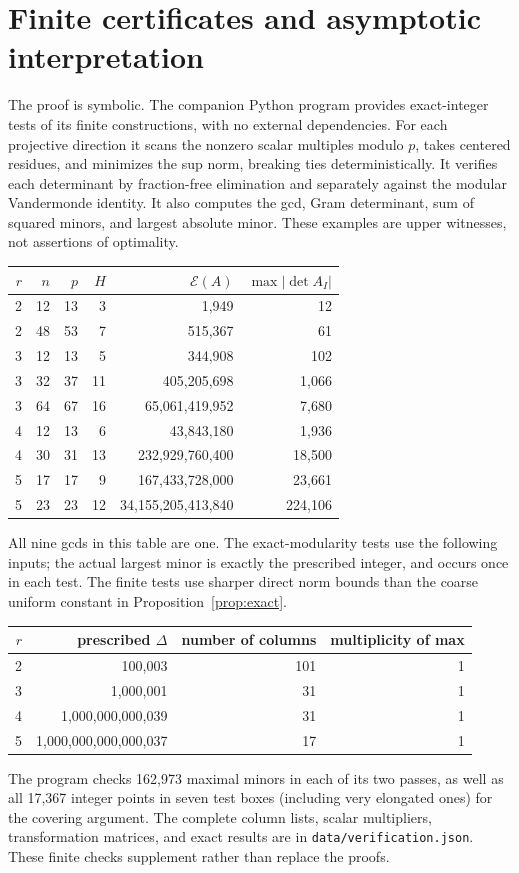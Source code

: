 \documentclass[11pt]{article}
\theoremstyle{remark}\newtheorem{remark}[theorem]{Remark}
\begin{document}
\section{Finite certificates and asymptotic interpretation}
The proof is symbolic. The companion Python program provides exact-integer tests of its finite constructions, with no external dependencies. For each projective direction it scans the nonzero scalar multiples modulo $p$, takes centered residues, and minimizes the sup norm, breaking ties deterministically. It verifies each determinant by fraction-free elimination and separately against the modular Vandermonde identity. It also computes the gcd, Gram determinant, sum of squared minors, and largest absolute minor. These examples are upper witnesses, not assertions of optimality.

\begin{center}
\begin{tabular}{rrrrrr}
\toprule
$r$&$n$&$p$&$H$&$\mathcal E(A)$&$\max |\det A_I|$\\
\midrule
2&12&13&3&1,949&12\\
2&48&53&7&515,367&61\\
3&12&13&5&344,908&102\\
3&32&37&11&405,205,698&1,066\\
3&64&67&16&65,061,419,952&7,680\\
4&12&13&6&43,843,180&1,936\\
4&30&31&13&232,929,760,400&18,500\\
5&17&17&9&167,433,728,000&23,661\\
5&23&23&12&34,155,205,413,840&224,106\\
\bottomrule
\end{tabular}
\end{center}
All nine gcds in this table are one. The exact-modularity tests use the following inputs; the actual largest minor is exactly the prescribed integer, and occurs once in each test. The finite tests use sharper direct norm bounds than the coarse uniform constant in Proposition~\ref{prop:exact}.
\begin{center}
\begin{tabular}{rrrr}
\toprule
$r$& prescribed $\Delta$ & number of columns & multiplicity of max\\
\midrule
2&100,003&101&1\\
3&1,000,001&31&1\\
4&1,000,000,000,039&31&1\\
5&1,000,000,000,000,037&17&1\\
\bottomrule
\end{tabular}
\end{center}
The program checks 162,973 maximal minors in each of its two passes, as well as all 17,367 integer points in seven test boxes (including very elongated ones) for the covering argument. The complete column lists, scalar multipliers, transformation matrices, and exact results are in \texttt{data/verification.json}. These finite checks supplement rather than replace the proofs.
\end{document}
